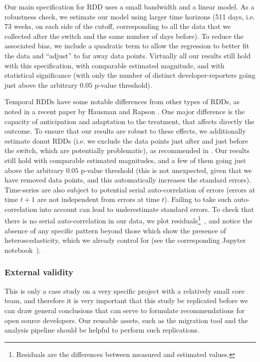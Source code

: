 Our main specification for RDD uses a small bandwidth and a linear model.
As a robustness check, we estimate our model using larger time horizons (511 days, i.e. 73 weeks, on each side of the cutoff, corresponding to all the data that we collected after the switch and the same number of days before).
To reduce the associated bias, we include a quadratic term to allow the regression to better fit the data and ``adjust'' to far away data points.
Virtually all our results still hold with this specification, with comparable estimated magnitude, and with statistical significance (with only the number of distinct developer-reporters going just above the arbitrary $0.05$ p-value threshold).

Temporal RDDs have some notable differences from other types of RDDs, as noted in a recent paper by Hausman and Rapson \cite{hausman2018regression}. One major difference is the capacity of anticipation and adaptation to the treatment, that affects directly the outcome. To ensure that our results are robust to these effects, we additionally estimate donut RDDs (i.e. we exclude the data points just after and just before the switch, which are potentially problematic), as recommended in \cite{hausman2018regression}. Our results still hold with comparable estimated magnitudes, and a few of them going just above the arbitrary $0.05$ p-value threshold (this is not unexpected, given that we have removed data points, and this automatically increases the standard errors).
Time-series are also subject to potential serial auto-correlation of errors (errors at time $t+1$ are not independent from errors at time $t$). Failing to take such auto-correlation into account can lead to underestimate standard errors. To check that there is no serial auto-correlation in our data, we plot residuals\footnote{Residuals are the differences between measured and estimated values.}~\cite{wagner2002segmented}, and notice the absence of any specific pattern beyond those which show the presence of heteroscedasticity, which we already control for (see the corresponding Jupyter notebook~\cite{zimmermann2019bugtracker}).

\subsubsection{External validity}

This is only a case study on a very specific project with a relatively small core team, and therefore it is very important that this study be replicated before we can draw general conclusions that can serve to formulate recommendations for open source developers. Our reusable assets, such as the migration tool and the analysis pipeline should be helpful to perform such replications.

